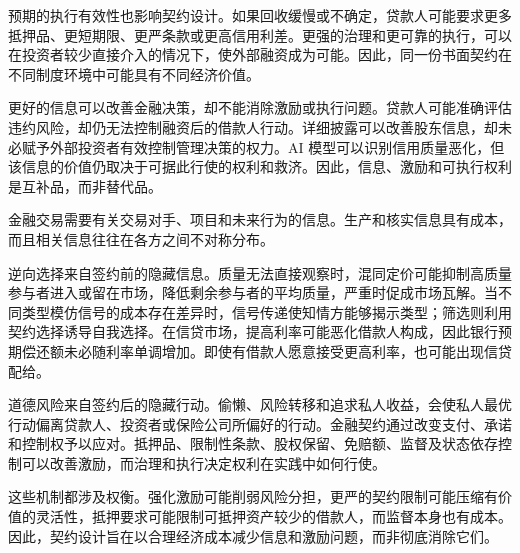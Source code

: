 预期的执行有效性也影响契约设计。如果回收缓慢或不确定，贷款人可能要求更多抵押品、更短期限、更严条款或更高信用利差。更强的治理和更可靠的执行，可以在投资者较少直接介入的情况下，使外部融资成为可能。因此，同一份书面契约在不同制度环境中可能具有不同经济价值。

\begin{tcolorbox}[
  enhanced,
  breakable,
  colback=white,
  colframe=FinanceBlue,
  boxrule=0.7pt,
  sharp corners,
  borderline west={2.2pt}{0pt}{FinanceBlue},
  title=\textbf{金融视角：更好的信息并不能解决全部问题},
  coltitle=white,
  colbacktitle=FinanceBlue,
  fonttitle=\bfseries,
  before skip=1.2em,
  after skip=1.2em
]

更好的信息可以改善金融决策，却不能消除激励或执行问题。贷款人可能准确评估违约风险，却仍无法控制融资后的借款人行动。详细披露可以改善股东信息，却未必赋予外部投资者有效控制管理决策的权力。AI 模型可以识别信用质量恶化，但该信息的价值仍取决于可据此行使的权利和救济。因此，信息、激励和可执行权利是互补品，而非替代品。

\end{tcolorbox}



金融交易需要有关交易对手、项目和未来行为的信息。生产和核实信息具有成本，而且相关信息往往在各方之间不对称分布。

逆向选择来自签约前的隐藏信息。质量无法直接观察时，混同定价可能抑制高质量参与者进入或留在市场，降低剩余参与者的平均质量，严重时促成市场瓦解。当不同类型模仿信号的成本存在差异时，信号传递使知情方能够揭示类型；筛选则利用契约选择诱导自我选择。在信贷市场，提高利率可能恶化借款人构成，因此银行预期偿还额未必随利率单调增加。即使有借款人愿意接受更高利率，也可能出现信贷配给。

道德风险来自签约后的隐藏行动。偷懒、风险转移和追求私人收益，会使私人最优行动偏离贷款人、投资者或保险公司所偏好的行动。金融契约通过改变支付、承诺和控制权予以应对。抵押品、限制性条款、股权保留、免赔额、监督及状态依存控制可以改善激励，而治理和执行决定权利在实践中如何行使。

这些机制都涉及权衡。强化激励可能削弱风险分担，更严的契约限制可能压缩有价值的灵活性，抵押要求可能限制可抵押资产较少的借款人，而监督本身也有成本。因此，契约设计旨在以合理经济成本减少信息和激励问题，而非彻底消除它们。


